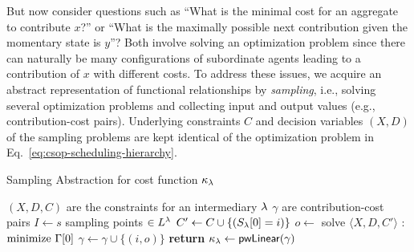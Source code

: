 \documentclass[conference]{IEEEtran}
\newcommand{\eref}[1]{Eq.~\ref{#1}}
\begin{document}
But now consider questions such as ``What is the minimal cost for an aggregate to contribute
$x$?'' or ``What is the maximally possible next contribution given the momentary state is $y$''? Both 
involve solving an optimization problem since there can naturally be many configurations
of subordinate agents leading to a contribution of $x$ with different costs. To address these issues,
we acquire an abstract representation of functional relationships by \emph{sampling}, i.e., solving 
several optimization problems and collecting input and output values (e.g., contribution-cost pairs).
Underlying constraints $C$ and decision variables $(X, D)$ 
of the sampling problems are kept identical of the optimization problem in \eref{eq:csop-scheduling-hierarchy}.
%
\begin{algorithm}
\caption{Sampling Abstraction for cost function $\kappa_\lambda$}\label{alg:SamplingAbstraction}
\begin{algorithmic}[1]
\Require $(X, D, C)$ are the constraints for an intermediary $\lambda$
\Ensure $\gamma$ are contribution-cost pairs 
\State $I \gets s$ sampling points $\in L^\lambda$ 
\State $C' \gets C \cup \{(S_{\lambda}[0] = i)\}$
\State $o \gets $ solve $\langle X, D, C'\rangle$ : $\text{minimize } \Gamma[0]$
\State $\gamma \gets \gamma \cup \{(i,o)\}$
\EndFor
\State \textbf{return} $\kappa_\lambda \gets \mathsf{pwLinear}(\gamma)$ 
\EndProcedure
\end{algorithmic}
\end{algorithm}
%
\end{document}
